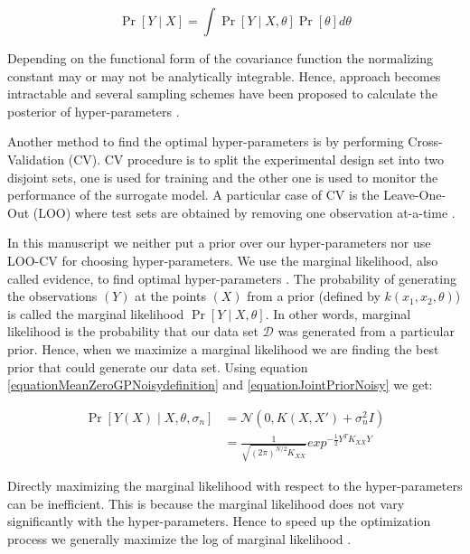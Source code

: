 \begin{equation}
    \Pr[Y \mid X] = \int \Pr[Y \mid X, \theta]\Pr[\theta]d\theta
\end{equation}

Depending on the functional form of the covariance function the normalizing constant may or may not be analytically integrable. Hence, approach becomes intractable and several sampling schemes have been proposed to calculate the posterior of hyper-parameters \cite{osborne2010bayesian, neal2011mcmc}.

Another method to find the optimal hyper-parameters is by performing Cross-Validation (CV). CV procedure is to split the experimental design set into two disjoint sets, one is used for training and the other one is used to monitor the performance of the surrogate model. A particular case of CV is the Leave-One-Out (LOO) where test sets are obtained by removing one observation at-a-time \cite{rasmussen2006gaussian, dubrule1983cross, le2013multi}. 

In this manuscript we neither put a prior over our hyper-parameters nor use LOO-CV for choosing hyper-parameters. We use the marginal likelihood, also called evidence, to find optimal hyper-parameters \cite{mackay2003information}. The probability of generating the observations $(Y)$ at the points $(X)$ from a prior (defined by $k(x_{1}, x_{2}, \theta)$) is called the marginal likelihood $\Pr[Y \mid X, \theta]$. In other words, marginal likelihood is the probability that our data set $\mathcal{D}$ was generated from a particular prior. Hence, when we maximize a marginal likelihood we are finding the best prior that could generate our data set. Using equation \ref{equationMeanZeroGPNoisydefinition} and \ref{equationJointPriorNoisy} we get:

\begin{equation}\label{equationMarginalLikelihood}
\begin{aligned}
\Pr[Y(X) \mid X, \theta, \sigma_{n}] & = \mathcal{N}(0 , K(X, X') + \sigma^{2}_{n}I)  \\
& = \frac{1}{\sqrt{(2\pi)^{N/2} K_{XX}}} exp^{-\frac{1}{2}Y^{T}K_{XX}Y}
\end{aligned}
\end{equation}

Directly maximizing the marginal likelihood with respect to the hyper-parameters can be inefficient. This is because the marginal likelihood does not vary significantly with the hyper-parameters. Hence to speed up the optimization process we generally maximize the log of marginal likelihood \cite{rasmussen2006gaussian}. 

